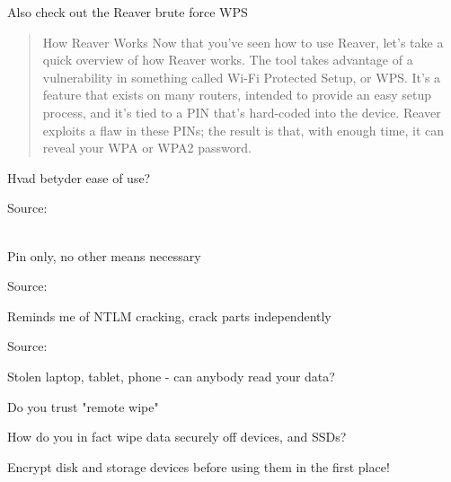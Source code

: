 \documentclass[20pt,landscape,a4paper,footrule]{foils}
\begin{document}
\begin{list1}
\item {}
\item Also check out the Reaver brute force WPS\\ 
\end{list1}


\begin{quote}
How Reaver Works
Now that you've seen how to use Reaver, let's take a quick overview of how Reaver works. The tool takes advantage of a vulnerability in something called Wi-Fi Protected Setup, or WPS. It's a feature that exists on many routers, intended to provide an easy setup process, and it's tied to a PIN that's hard-coded into the device. Reaver exploits a flaw in these PINs; the result is that, with enough time, it can reveal your WPA or WPA2 password.
\end{quote}

\centerline{Hvad betyder ease of use?}

Source: \\
\\
{\footnotesize {}}



\centerline{Pin only, no other means necessary}

Source:\\





\centerline{Reminds me of NTLM cracking, crack parts independently}

Source:\\





\begin{list1}
\item Stolen laptop, tablet, phone - can anybody read your data?
\item Do you trust "remote wipe"
\item How do you in fact wipe data securely off devices, and SSDs?
\item Encrypt disk and storage devices before using them in the first place!
\end{list1}
\end{document}
